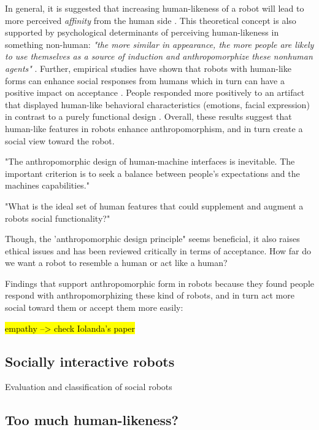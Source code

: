 \documentclass[lettersize, apacite, twoside, HRI]{apa_HRI}
\begin{document}
	In general, it is suggested that increasing human-likeness of a robot	 will lead to more perceived \textit{affinity} from the human side \cite{mori_uncanny_1970}. This theoretical concept is also supported by psychological determinants of perceiving human-likeness in something non-human: \textit{"the more similar in appearance, the more people are likely to use themselves as a source of induction and anthropomorphize these nonhuman agents"} \cite{epley_seeing_2007}. Further, empirical studies have shown that robots with human-like forms can enhance social responses from humans which in turn can have a positive impact on acceptance \cite{venkatesh_theoretical_2000,duffy_anthropomorphism_2003,goetz_cooperation_2002}.  People responded more positively to an artifact that displayed human-like behavioral characteristics (emotions, facial expression) in contrast to a purely functional design \cite{eyssel_anthropomorphic_2010,krach_can_2008,reeves_media_1996,riek_how_2009}. Overall, these results suggest that human-like features in robots enhance anthropomorphism, and in turn create a social view toward the robot.


	"The anthropomorphic design of human-machine interfaces is inevitable. The important criterion is to seek a balance between people's expectations and the machines capabilities." \cite{duffy_anthropomorphism_2002}

	"What is the ideal set of human features that could supplement and augment a robots  social functionality?" \cite{duffy_anthropomorphism_2002}


	Though, the 'anthropomorphic design principle" seems beneficial, it also raises ethical issues and has been reviewed critically in terms of acceptance. How far do we want a robot to resemble a human or act like a human?

	Findings that support anthropomorphic form in robots because they found people respond with anthropomorphizing these kind of robots, and in turn act more social toward them or accept them more easily:

	\hl{empathy --> check Iolanda's paper}

\subsection{Socially interactive robots}
\label{sec:5.1}

Evaluation and classification of social robots


\subsection{Too much human-likeness?}
\label{sec:5.2}
\end{document}
